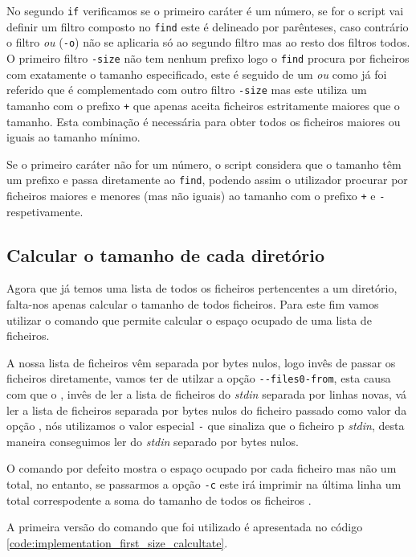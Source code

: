 No segundo \Verb|if| verificamos se o primeiro caráter é um número, se for o
script vai definir um filtro composto no \Verb|find| este é delineado por
parênteses, caso contrário o filtro \emph{ou} (\Verb|-o|) não se aplicaria só ao
segundo filtro mas ao resto dos filtros todos. O primeiro filtro \Verb|-size|
não tem nenhum prefixo logo o \Verb|find| procura por ficheiros com exatamente o
tamanho especificado, este é seguido de um \emph{ou} como já foi referido que é
complementado com outro filtro \Verb|-size| mas este utiliza um tamanho com o
prefixo \Verb|+| que apenas aceita ficheiros estritamente maiores que o tamanho.
Esta combinação é necessária para obter todos os ficheiros maiores ou iguais ao
tamanho mínimo.

Se o primeiro caráter não for um número, o script considera que o tamanho têm um
prefixo e passa diretamente ao \Verb|find|, podendo assim o utilizador procurar
por ficheiros maiores e menores (mas não iguais) ao tamanho com o prefixo
\Verb|+| e \Verb|-| respetivamente.

\subsection{Calcular o tamanho de cada diretório}

Agora que já temos uma lista de todos os ficheiros pertencentes a um
diretório, falta-nos apenas calcular o tamanho de todos ficheiros.
Para este fim vamos utilizar o comando  que permite calcular o
espaço ocupado de uma lista de ficheiros.

A nossa lista de ficheiros vêm separada por bytes nulos, logo invês de passar os
ficheiros diretamente, vamos ter de utilzar a opção \Verb|--files0-from|, esta
causa com que o , invês de ler a lista de ficheiros do
\emph{stdin} separada por linhas novas, vá ler a lista de ficheiros separada por
bytes nulos do ficheiro passado como valor da opção \cite{du_man}, nós utilizamos
o valor especial \Verb|-| que sinaliza que o ficheiro p \emph{stdin}, desta
maneira conseguimos ler do \emph{stdin} separado por bytes nulos.

O comando  por defeito mostra o espaço ocupado por cada ficheiro
mas não um total, no entanto, se passarmos a opção \Verb|-c| este irá imprimir
na última linha um total correspodente a soma do tamanho de todos os ficheiros
\cite{du_man}.

A primeira versão do comando que foi utilizado é apresentada no código
\ref{code:implementation_first_size_calcultate}.

